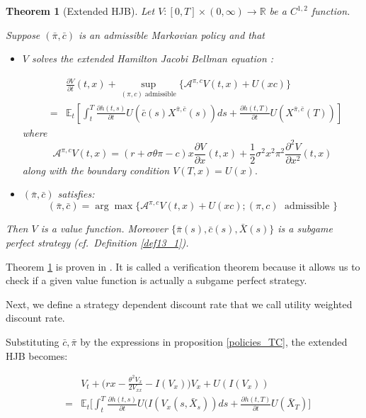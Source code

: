 \documentclass[11pt, psfig]{article}
\newtheorem{theorem}{Theorem}[section]
\theoremstyle{definition}
\theoremstyle{remark}
\numberwithin{equation}{section}
\def\sE{\mathbb{E}}
\newcommand{\be}{\begin{equation}}
\newcommand{\ee}{\end{equation}}
\begin{document}
\begin{theorem}[Extended HJB]\label{thm151_1}
 Let $V:[0,T]\times  (0,\infty)\rightarrow \mathbb{R}$ be a $C^{1,2}$ function.
 
 Suppose $(\bar{\pi}, \bar{c})$ is an admissible Markovian policy and that 
 \begin{itemize}
\item $V$ solves the extended Hamilton Jacobi Bellman equation : 
 
 \begin{eqnarray}  \label{extended_HJB}
&&\frac{\partial V}{\partial t}(t,x)+\sup_{(\pi ,c)\; \textrm{admissible}}\big\{ \mathcal{A}^{\pi,c}V(t,x)+U (xc)\big\} \\
&=&\sE_t \left[\int_t^T \frac{\partial h(t,s)}{\partial t}U(\bar{c}(s)X^{\bar{\pi},\bar{c}}(s) ) ds + \frac{\partial h(t,T)}{\partial t}U(X^{\bar{\pi},\bar{c}}(T) )\right]\nonumber
\end{eqnarray}
where 
\begin{equation}\label{eq14_5}
 \mathcal{A}^{\pi,c}V(t,x)= (r+\sigma\theta \pi -c)x
\frac{\partial V}{\partial x}(t,x)+\frac{1}{2}\sigma ^{2}x^2\pi ^{2}%
\frac{\partial ^{2}V}{\partial x^{2}}(t,x)
\end{equation}
along with the boundary condition $V(T,x)= U(x).$ 
\item $(\bar{\pi},\bar{c})$ satisfies:
\be  \label{eq151_2b}
(\bar{\pi},\bar{c}) = {\arg\max} \{ \mathcal{A}^{\pi,c}V(t,x)+U (xc) ; (\pi ,c)\; \textrm{ admissible }  \}
\ee
\end{itemize}
Then $V$ is a value function. Moreover $\{\bar{\pi}(s), \bar{c}(s), \bar{X}(s)\}$
 is a subgame perfect strategy (cf.\ Definition \ref{def13_1}).


\end{theorem}
Theorem \ref{thm151_1} is proven in \cite{Bj_Kh_Mu1}. It is called a verification theorem because it allows us to check if a given value function is actually a subgame perfect strategy.

Next, we define a strategy dependent discount rate that we call utility weighted discount rate.




Substituting $\bar{c}, \bar{\pi}$ by the expressions in proposition \ref{policies_TC}, the extended HJB becomes:

\begin{eqnarray*}\label{Ext_HJB2}
&&V_t+\big(rx-\frac{\theta^2 V_x}{2 V_{xx}}-I(V_x)\big)V_x+U(I(V_x))\\
&=&\sE_t \bigg[ \int_t^T \frac{\partial h(t,s)}{\partial t}U(I(V_x(s,\bar{X}_s))ds+\frac{\partial h(t,T)}{\partial t}U(\bar{X}_T)\bigg]
\end{eqnarray*}
\end{document}
